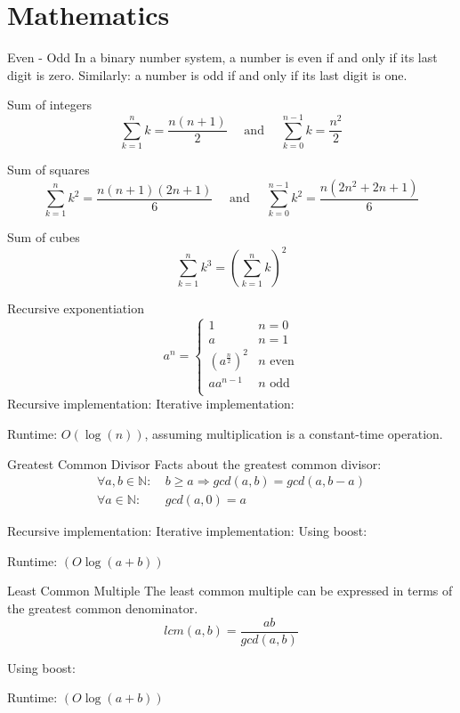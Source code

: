 \documentclass[guide.tex]{subfiles}
\begin{document}
\section{Mathematics}

\begin{matht}{Even - Odd}
  In a binary number system, a number is even if and only if its last digit is zero.
  Similarly: a number is odd if and only if its last digit is one.

\end{matht}

\begin{matht}{Sum of integers}
  \[
    \sum_{k = 1}^{n}k = \frac{n(n+1)}{2}
    \quad
    \text{ and }
    \quad
    \sum_{k = 0}^{n - 1}k = \frac{n^2}{2}
  \]
\end{matht}

\begin{matht}{Sum of squares}
  \[
    \sum_{k = 1}^{n}k^2 = \frac{n(n+1)(2n+1)}{6}
    \quad
    \text{ and }
    \quad
    \sum_{k = 0}^{n - 1}k^2 = \frac{n(2n^2+2n+1)}{6}
  \]
\end{matht}

\begin{matht}{Sum of cubes}
  \[
    \sum_{k = 1}^{n}k^3 = \left(\sum_{k = 1}^{n}k\right)^2
  \]
\end{matht}

\begin{matht}{Recursive exponentiation}
  \[
    a^n
    =
    \begin{cases}
      1 & n = 0\\
      a & n = 1\\
      \left(a^{\frac{n}{2}}\right)^{2} & n \text{ even}\\
      aa^{n-1} & n \text{ odd}\\
    \end{cases}
  \]
  Recursive implementation:
  Iterative implementation:

  Runtime: $O(\log(n))$, assuming multiplication is a constant-time operation.
\end{matht}

\begin{matht}{Greatest Common Divisor}
  Facts about the greatest common divisor:
  \begin{align*} 
    \forall a,b \in \mathbb{N}:\ & b \ge a \Rightarrow gcd(a, b) = gcd(a, b - a)\\
    \forall a \in \mathbb{N}:\ & gcd(a, 0) = a
  \end{align*}

  Recursive implementation:
  Iterative implementation:
  Using boost:

  Runtime: $(O\log(a + b))$
\end{matht}

\begin{matht}{Least Common Multiple}
  The least common multiple can be expressed in terms of the greatest common denominator.
  \[ lcm(a, b) = \frac{ab}{gcd(a, b)} \]

  Using boost:

  Runtime: $(O\log(a + b))$
\end{matht}
\end{document}
